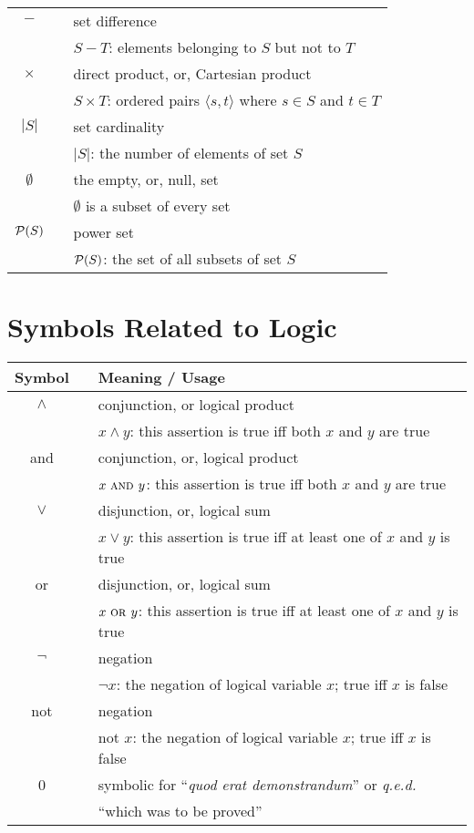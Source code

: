 \begin{tabular}{c|cl}
$-$
  & & set difference \\ 
  & & $S - T$: elements belonging to $S$ but not to $T$ \\ \hline
$\times$
  & & direct product, or, Cartesian product \\
  & & $S \times T$: ordered pairs $\langle s,t \rangle$ where $s \in S$ and $t \in T$ \\ \hline
$|S|$
  & & set cardinality \\
  & & $|S|$: the number of elements of set $S$ \\ \hline
$\emptyset$
  & & the empty, or, null, set \\
  & & $\emptyset$ is a subset of every set \\ \hline
$\mbox{$\cal P$}(S)$
  & & power set \\
  & & $\mbox{$\cal P$}(S)$: the set of all subsets of set $S$ \\ \hline
\end{tabular}

\section*{Symbols Related to Logic}

\begin{tabular}{c|cl}
{\bf Symbol} & & {\bf Meaning} / {\bf Usage} \\ \hline
\hline
$\wedge$
  & & conjunction, or logical product \\
  & & $x \wedge y$: this assertion is true iff both $x$ and $y$ are true \\
{\sc and}
  & & conjunction, or, logical product \\
  & & $x \ \mbox{\sc and } y$: this assertion is true iff both $x$ and $y$ are true \\ \hline
$\vee$
  & & disjunction, or, logical sum \\
  & & $x \vee y$:  this assertion is true iff at least one of $x$ and $y$ is true \\
{\sc or}
  & & disjunction, or, logical sum \\
  & & $x \ \mbox{\sc or } y$:  this assertion is true iff at least one of $x$ and $y$ is true  \\ \hline
$\neg$
  & & negation \\
  & & $\neg x$: the negation of logical variable $x$; true iff $x$ is false \\ 
{\sc not}
  & & negation \\
  & & {\sc not}  $x$: the negation of logical variable $x$; true iff $x$ is false \\ \hline
\qed
  & & symbolic for ``{\em quod erat demonstrandum}'' or {\em q.e.d.} \\
  & & ``which was to be proved'' \\
\hline 
\end{tabular}

